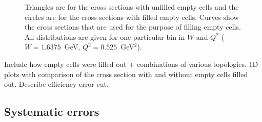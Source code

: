 \documentclass[prc,twocolumn,superscriptaddress,showpacs,amssymb,amsmath,amsfonts,linenumbers,aps]{revtex4-1}
\begin{document}
\begin{figure}[htp]
\begin{center}
\caption{\small  Triangles are for the cross sections with unfilled empty cells and the circles are for the cross sections with filled empty cells. Curves show the cross sections that are used for the purpose of filling empty cells. All distributions are given for one particular bin in $W$ and $Q^2$ ($W = 1.6375$~GeV, $Q^2 = 0.525$~GeV$^2$).} \label{fig:topologies}
\end{center}
\end{figure}

Include how empty cells were filled out + combinations of various topologies. 1D plots with comparison of the cross section with and without empty cells filled out. Describe efficiency error cut.

\subsection{Systematic errors}
\end{document}
